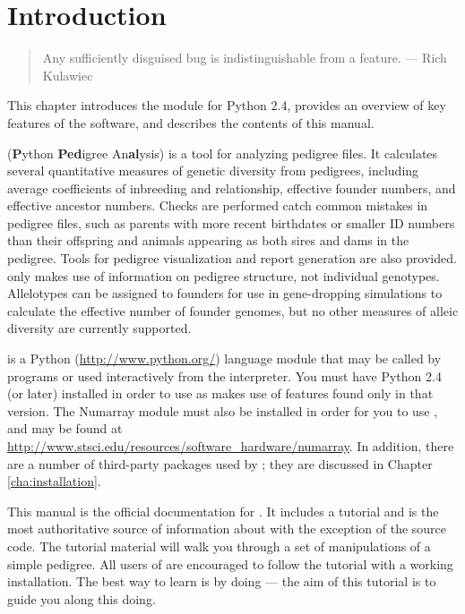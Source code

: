 \chapter{Introduction}
\label{cha:introduction}

\begin{quote}
Any sufficiently disguised bug is indistinguishable from a feature. --- Rich Kulawiec
\end{quote}
This chapter introduces the \PyPedal{} module for Python 2.4, provides an overview of key features of the software, and describes the contents of this manual.

\PyPedal{} (\textbf{P}ython \textbf{Ped}igree An\textbf{al}ysis) is a tool for analyzing pedigree files.  It calculates several quantitative measures of genetic diversity from pedigrees, including average coefficients of inbreeding and relationship, effective founder numbers, and effective ancestor numbers.  Checks are performed catch common mistakes in pedigree files, such as parents with more recent birthdates or smaller ID numbers than their offspring and animals appearing as both sires and dams in the pedigree.  Tools for pedigree visualization and report generation are also provided.  \PyPedal{} only makes use of information on pedigree structure, not individual genotypes.  Allelotypes can be assigned to founders for use in gene-dropping simulations to calculate the effective number of founder genomes, but no other measures of alleic diversity are currently supported.

\PyPedal{} is a Python (\url{http://www.python.org/}) language module that may be called by programs or used interactively from the interpreter.  You must have Python 2.4 (or later) installed in order to use \PyPedal{} as \PyPedal{} makes use of features found only in that version.  The Numarray module must also be installed in order for you to use \PyPedal{}, and may be found at \url{http://www.stsci.edu/resources/software_hardware/numarray}.  In addition, there are a number of third-party packages used by \PyPedal{}; they are discussed in Chapter \ref{cha:installation}.

This manual is the official documentation for \PyPedal{}. It includes a tutorial and is the most authoritative source of information about \PyPedal{} with the exception of the source code. The tutorial material will walk you through a set of manipulations of a simple pedigree.  All users of \PyPedal{} are encouraged to follow the tutorial with a working \PyPedal{} installation. The best way to learn is by doing --- the aim of this tutorial is to guide you along this doing.

